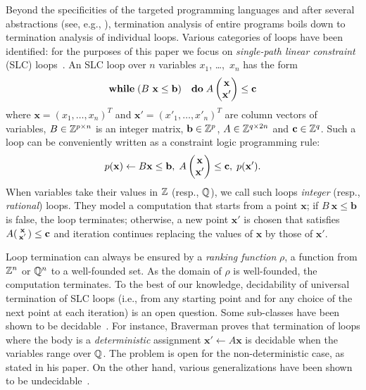 \documentclass{acm_proc_article-sp}
\begin{document}
Beyond the specificities of the targeted programming languages and after
several abstractions (see, e.g., \cite{SpotoMP10}), termination analysis
of entire programs boils down to termination analysis of individual loops.
Various categories of loops have been identified: for the purposes of
this paper we focus on \emph{single-path linear constraint} (SLC)
loops~\cite{Ben-AmramG13TR}.
An SLC loop over $n$ variables $x_1$, \dots,~$ x_n$ has the form
\[
  \textbf{while} \; (B\ \mathbf{x} \le \mathbf{b})
  \quad \textbf{do} \;
    A \begin{pmatrix}
        \mathbf{x} \cr
        \mathbf{x}'
      \end{pmatrix} \le \mathbf{c}
\]
where $\mathbf{x} = (x_1, \ldots, x_n)^T$
and $\mathbf{x}'=(x'_1, \ldots, x'_n)^T$
are column vectors of variables,
$B \in \mathbb{Z}^{p \times n}$ is an integer matrix, $\mathbf{b} \in \mathbb{Z}^p$,
$A \in \mathbb{Z}^{q \times 2n}$ and $\mathbf{c} \in \mathbb{Z}^q$.
Such a loop can be conveniently written as a constraint logic
programming rule:
\[
   p(\mathbf{x})
     \leftarrow
       B \mathbf{x} \le \mathbf{b}, \;
       A \begin{pmatrix}
           \mathbf{x} \cr
           \mathbf{x}'
         \end{pmatrix} \le \mathbf{c}, \; p(\mathbf{x}').
\]
When variables take their values in $\mathbb{Z}$ (resp., $\mathbb{Q}$),
we call such loops \emph{integer} (resp., \emph{rational}) loops.
They model a computation that starts from a point $\mathbf{x}$;
if $B\ \mathbf{x} \le \mathbf{b}$ is false, the loop terminates;
otherwise, a new point $\mathbf{x}'$ is chosen that satisfies
\(
   A (\begin{smallmatrix}
        \mathbf{x} \cr
        \mathbf{x}'
      \end{smallmatrix}) \le \mathbf{c}
\)
and iteration continues replacing the values of $\mathbf{x}$
by those of $\mathbf{x}'$.

Loop termination can always be ensured by a \emph{ranking function}
$\rho$, a function from $\mathbb{Z}^n$ or $\mathbb{Q}^n$ to a well-founded set.
As the domain of $\rho$ is well-founded, the computation terminates.
To the best of our knowledge, decidability of universal termination
of SLC loops (i.e., from any starting point and for any choice of
the next point at each iteration) is an open question.
Some sub-classes have been shown to be
decidable~\cite{BozgaIK12,Braverman06,Tiwari04}.
For instance, Braverman proves that termination of
loops where the body is a \emph{deterministic} assignment
$\mathbf{x}' \leftarrow A \mathbf{x}$ is decidable when the variables range over $\mathbb{Q}$.
The problem is open for the non-deterministic case, as stated in his paper.
On the other hand, various generalizations have been shown
to be undecidable~\cite{Ben-AmramGM12}.
\end{document}
